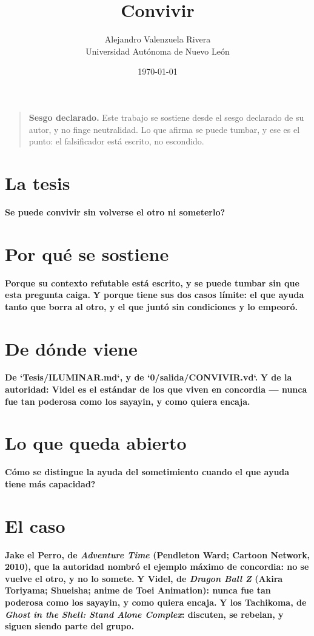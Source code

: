 \documentclass[11pt,a4paper]{article}
\title{Convivir}
\author{Alejandro Valenzuela Rivera\\\small Universidad Autónoma de Nuevo León}
\date{\today}
\begin{document}
\maketitle

\begin{quote}
\textbf{Sesgo declarado.} Este trabajo se sostiene desde el sesgo declarado de su autor, y no finge neutralidad. Lo que afirma se puede tumbar, y ese es el punto: el falsificador está escrito, no escondido.
\end{quote}

\section{La tesis}
\textbf{\textquestiondown{}Se puede convivir sin volverse el otro ni someterlo?}

\section{Por qué se sostiene}
\textbf{Porque su contexto refutable está escrito, y se puede tumbar sin que esta pregunta caiga.} \textbf{Y porque tiene sus dos casos límite: el que ayuda tanto que borra al otro, y el que juntó sin condiciones y lo empeoró.}

\section{De dónde viene}
\textbf{De `Tesis/ILUMINAR.md`, y de `0/salida/CONVIVIR.vd`.} \textbf{Y de la autoridad: Videl es el estándar de los que viven en concordia — nunca fue tan poderosa como los sayayin, y como quiera encaja.}

\section{Lo que queda abierto}
\textbf{\textquestiondown{}Cómo se distingue la ayuda del sometimiento cuando el que ayuda tiene más capacidad?}

\section{El caso}
\textbf{Jake el Perro, de \emph{Adventure Time} (Pendleton Ward; Cartoon Network, 2010), que la autoridad nombró el ejemplo máximo de concordia: no se vuelve el otro, y no lo somete.} \textbf{Y Videl, de \emph{Dragon Ball Z} (Akira Toriyama; Shueisha; anime de Toei Animation): nunca fue tan poderosa como los sayayin, y como quiera encaja.} \textbf{Y los Tachikoma, de \emph{Ghost in the Shell: Stand Alone Complex}: discuten, se rebelan, y siguen siendo parte del grupo.}
\end{document}
